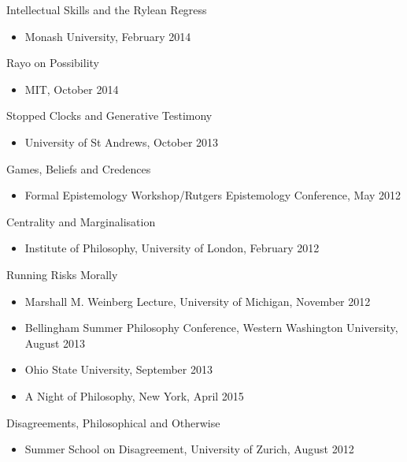 \documentclass[
  10pt,
  letterpaper,
  DIV=11,
  numbers=noendperiod,
  twoside]{scrartcl}
\providecommand{\tightlist}{%
  \setlength{\itemsep}{0pt}\setlength{\parskip}{0pt}}
\begin{document}
Intellectual Skills and the Rylean Regress

\begin{itemize}
\tightlist
\item
  Monash University, February 2014
\end{itemize}

Rayo on Possibility

\begin{itemize}
\tightlist
\item
  MIT, October 2014
\end{itemize}

Stopped Clocks and Generative Testimony

\begin{itemize}
\tightlist
\item
  University of St Andrews, October 2013
\end{itemize}

\newpage

Games, Beliefs and Credences

\begin{itemize}
\tightlist
\item
  Formal Epistemology Workshop/Rutgers Epistemology Conference, May 2012
\end{itemize}

Centrality and Marginalisation

\begin{itemize}
\tightlist
\item
  Institute of Philosophy, University of London, February 2012
\end{itemize}

Running Risks Morally

\begin{itemize}
\tightlist
\item
  Marshall M. Weinberg Lecture, University of Michigan, November 2012
\item
  Bellingham Summer Philosophy Conference, Western Washington
  University, August 2013
\item
  Ohio State University, September 2013
\item
  A Night of Philosophy, New York, April 2015
\end{itemize}

Disagreements, Philosophical and Otherwise

\begin{itemize}
\tightlist
\item
  Summer School on Disagreement, University of Zurich, August 2012
\end{itemize}
\end{document}
